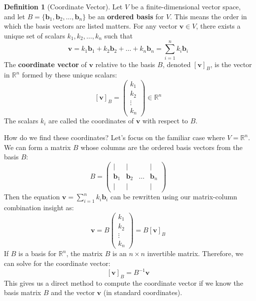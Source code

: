 \documentclass[11pt]{article}
\theoremstyle{definition}
\newtheorem{definition}[theorem]{Definition}
\theoremstyle{remark}
\begin{document}
\begin{definition}[Coordinate Vector]
Let $V$ be a finite-dimensional vector space, and let $B = \{\mathbf{b}_1, \mathbf{b}_2, \dots, \mathbf{b}_n\}$ be an \textbf{ordered basis} for $V$. This means the order in which the basis vectors are listed matters.
For any vector $\mathbf{v} \in V$, there exists a unique set of scalars $k_1, k_2, \dots, k_n$ such that
\[ \mathbf{v} = k_1 \mathbf{b}_1 + k_2 \mathbf{b}_2 + \dots + k_n \mathbf{b}_n = \sum_{i=1}^n k_i \mathbf{b}_i \]
The \textbf{coordinate vector} of $\mathbf{v}$ relative to the basis $B$, denoted $[\mathbf{v}]_B$, is the vector in $\mathbb{R}^n$ formed by these unique scalars:
\[ [\mathbf{v}]_B = \begin{pmatrix} k_1 \\ k_2 \\ \vdots \\ k_n \end{pmatrix} \in \mathbb{R}^n \]
The scalars $k_i$ are called the coordinates of $\mathbf{v}$ with respect to $B$.
\end{definition}

How do we find these coordinates? Let's focus on the familiar case where $V = \mathbb{R}^n$. We can form a matrix $B$ whose columns are the ordered basis vectors from the basis $B$:
\[ B = \begin{pmatrix} | & | & & | \\ \mathbf{b}_1 & \mathbf{b}_2 & \dots & \mathbf{b}_n \\ | & | & & | \end{pmatrix} \]
Then the equation $\mathbf{v} = \sum_{i=1}^n k_i \mathbf{b}_i$ can be rewritten using our matrix-column combination insight as:
\[ \mathbf{v} = B \begin{pmatrix} k_1 \\ k_2 \\ \vdots \\ k_n \end{pmatrix} = B [\mathbf{v}]_B \]
If $B$ is a basis for $\mathbb{R}^n$, the matrix $B$ is an $n \times n$ invertible matrix. Therefore, we can solve for the coordinate vector:
\[ [\mathbf{v}]_B = B^{-1} \mathbf{v} \]
This gives us a direct method to compute the coordinate vector if we know the basis matrix $B$ and the vector $\mathbf{v}$ (in standard coordinates).
\end{document}
